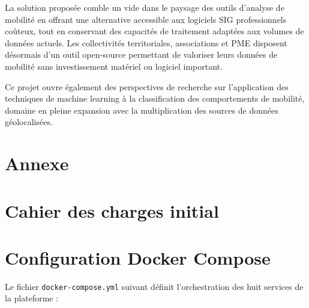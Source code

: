 \documentclass[french]{tai_info} %
\begin{document}
La solution proposée comble un vide dans le paysage des outils d'analyse de mobilité en offrant une alternative accessible aux logiciels SIG professionnels coûteux, tout en conservant des capacités de traitement adaptées aux volumes de données actuels. Les collectivités territoriales, associations et PME disposent désormais d'un outil open-source permettant de valoriser leurs données de mobilité sans investissement matériel ou logiciel important.

Ce projet ouvre également des perspectives de recherche sur l'application des techniques de machine learning à la classification des comportements de mobilité, domaine en pleine expansion avec la multiplication des sources de données géolocalisées.

\section{Annexe}

\appendix 

\section{Cahier des charges initial}


 

\section{Configuration Docker Compose}

Le fichier \texttt{docker-compose.yml} suivant définit l'orchestration des huit services de la plateforme :
\end{document}
